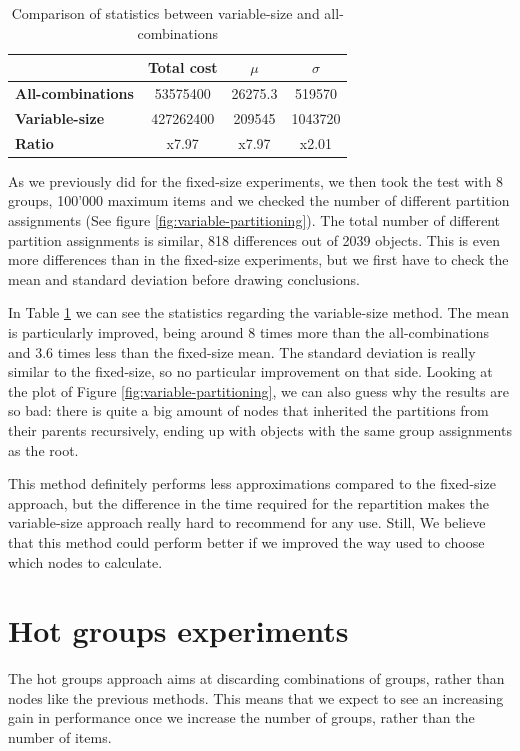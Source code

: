 \begin{table}[!htb]
  \centering
  \begin{tabular}{l c c c}
    \hline
    & \textbf{Total cost} & \textbf{$\mu$} & \textbf{$\sigma$} \\
    \hline
    \textbf{All-combinations} & 53575400 & 26275.3 & 519570\\
    \textbf{Variable-size} & 427262400 & 209545 & 1043720 \\
    \hline
    \textbf{Ratio} & x7.97 & x7.97 & x2.01 \\
    \hline
  \end{tabular}
  \caption{Comparison of statistics between variable-size and all-combinations}\label{tab:mean-stddev-variable-all}
\end{table}

As we previously did for the fixed-size experiments, we then took the test with 8 groups, 100'000 maximum items and we checked the number of different partition assignments (See figure \ref{fig:variable-partitioning}). The total number of different partition assignments is similar, 818 differences out of 2039 objects. This is even more differences than in the fixed-size experiments, but we first have to check the mean and standard deviation before drawing conclusions.

In Table \ref{tab:mean-stddev-variable-all} we can see the statistics regarding the variable-size method. The mean is particularly improved, being around 8 times more than the all-combinations and 3.6 times less than the fixed-size mean. The standard deviation is really similar to the fixed-size, so no particular improvement on that side.
Looking at the plot of Figure \ref{fig:variable-partitioning}, we can also guess why the results are so bad: there is quite a big amount of nodes that inherited the partitions from their parents recursively, ending up with objects with the same group assignments as the root. 

This method definitely performs less approximations compared to the fixed-size approach, but the difference in the time required for the repartition makes the variable-size approach really hard to recommend for any use. Still, We believe that this method could perform better if we improved the way used to choose which nodes to calculate.

\section{Hot groups experiments}\label{sec:hot-groups-experiments}
The hot groups approach aims at discarding combinations of groups, rather than nodes like the previous methods. This means that we expect to see an increasing gain in performance once we increase the number of groups, rather than the number of items.

